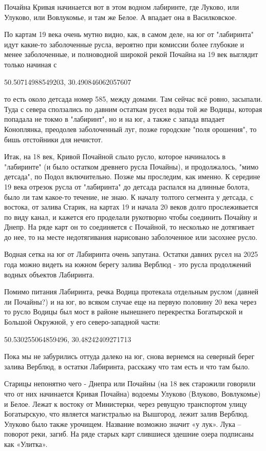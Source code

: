 Почайна Кривая начинается вот в этом водном лабиринте, где Луково, или Улуково, или Вовлукомье, и там же Белое. А впадает она в Василковское.

По картам 19 века очень мутно видно, как, в самом деле, на юг от "лабиринта" идут какие-то заболоченные русла, вероятно при комиссии более глубокие и менее заболоченные, и полноводной широкой рекой Почайна на 19 век выглядит только начиная с 

50.50714988549203, 30.490846062057607

то есть около детсада номер 585, между домами. Там сейчас всё ровно, засыпали. Туда с севера сползались по давним остаткам русел воды той же Водицы, которая попадала не токмо в "лабиринт", но и на юг, а также с запада впадает Коноплянка, преодолев заболоченный луг, позже городские "поля орошения", то бишь отстойники для нечистот.

Итак, на 18 век, Кривой Почайной слыло русло, которое начиналось в "лабиринте" (и было остатком древнего русла Почайны), и продолжалось, "мимо детсада", по Подол включительно. Позже мы проследим, как именно. К середине 19 века отрезок русла от "лабиринта" до детсада распался на длинные болота, было ли там какое-то течение, не знаю. К началу толтого сегмента у детсада, с востока, от залива Старик, на картах 19 и начала 20 веков долго прослеживается по виду канал, и кажется его проделали рукотворно чтобы соединить Почайну и Днепр. На ряде карт он то соединяется с Почайной, то несколько не дотягивает до нее, то на месте недотягивания нарисовано заболоченное или засохнее русло.

Водная сетка на юг от Лабиринта очень запутана. Остатки давних русел на 2025 года можно видеть на южном берегу залива Верблюд - это русла продолжений водных объектов Лабиринта.

Помимо питания Лабиринта, речка Водица протекала отдельным руслом (давней ли Почайны?) и на юг, во всяком случае еще на первую половину 20 века через то русло Водицы был мост в районе нынешнего перекрестка Богатырской и Большой Окружной, у его северо-западной части:

50.530255064859496, 30.48242409271713

Пока мы не забурились оттуда далеко на юг, снова вернемся на северный берег залива Верблюд, в остатки Лабиринта, расскажу что там есть и что там было.

Старицы непонятно чего - Днепра или Почайны (на 18 век старожили говорили что от них начинается Кривая Почайна) водоемы Улуково (Влуково, Вовлукомье) и Белое. Лежат к востоку от Министерки, через ревущую транспортом улицу Богатырскую, что является магистралью на Вышгород, лежит залив Верблюд. Улуково было также урочищем. Название возможно 
значит «у лук». Лука – поворот реки, загиб. 
На ряде старых карт слившиеся здешние озера подписаны как «Улитка».

